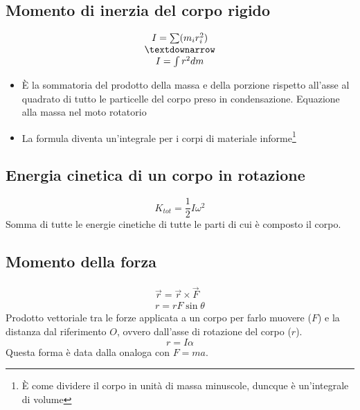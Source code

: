 \documentclass{book}
\begin{document}
\subsection{Momento di inerzia del corpo rigido}
\label{sec:mominidelcorporigid}
\begin{equation}
  \label{eq:mominidelcorporigid}
  \begin{matrix}
    I=\sum(m_ir^2_i)\\
    \textdownarrow\\
    I=\int r^2dm
  \end{matrix}
\end{equation}
\begin{itemize}
\item È la sommatoria del prodotto della massa e della porzione rispetto all'asse al quadrato di tutto le particelle del corpo preso in condensazione. {\color{red}Equazione alla massa nel moto rotatorio}
\item La formula diventa un'integrale per i corpi di materiale informe\footnote{È come dividere il corpo in unità di massa minuscole, duncque è un'integrale di volume}
\end{itemize}

\subsection{Energia cinetica di un corpo in rotazione}
\label{sec:encindiuncorinrot}

\begin{equation}
  \label{eq:encindiuncorinrot}
  K_{tot}=\frac{1}{2}I\omega^2
\end{equation}
Somma di tutte le energie cinetiche di tutte le parti di cui è composto il corpo.

\subsection{Momento della forza}
\label{sec:momdellaforz}

\begin{equation}
  \label{eq:momdellaforz}
  \begin{matrix}
    \vec{r}=\vec{r}\times{}\vec{F}\\
    r=r F\sin \theta
  \end{matrix}
\end{equation}
Prodotto vettoriale tra le forze applicata a un corpo per farlo muovere ($F$) e la distanza dal riferimento $O$, ovvero dall'asse di rotazione del corpo ($r$).
\begin{equation*}
  \boxed{r=I\alpha}
\end{equation*}
Questa forma è data dalla onaloga con $F=ma$.
\end{document}
